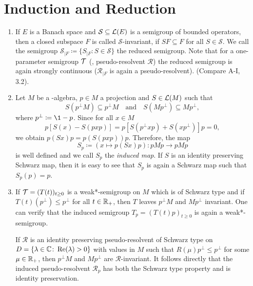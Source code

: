 \section{Induction and Reduction}
\begin{enumerate}[1., wide, labelsep=1em, itemindent=\parindent]
\item
If $ E $ is a Banach space and $ \mathcal{S} \subseteq \mathcal{L}(E) $ is a semigroup of bounded operators, then a closed subspace $ F $ is called $ \mathcal{S} $-invariant, if $ SF \subseteq F $ for all $ S \in \mathcal{S} $.
We call the semigroup $ \mathcal{S}_{\vert F} \coloneqq \{S_{\vert F} \colon S \in \mathcal{S} \} $ the reduced semigroup.
Note that for a one-parameter semigroup $ \mathcal{T} $ (\resp, pseudo-resolvent $ \mathcal{R} $) the reduced semigroup is again strongly continuous (\resp $ \mathcal{R}_{\vert F} $ is again a pseudo-resolvent). (Compare A-I, 3.2).

\item
Let $ M $ be a \WA-algebra, $ p \in M $ a projection and $ S \in \mathcal{L}(M) $ such that 
%
\[
	S( p^{\perp}M ) \subseteq p^{\perp}M 
	\quad \text{and} \quad 
	S( Mp^{\perp} ) \subseteq Mp^{\perp} ,  
\]
%
where $ p^{\perp} \coloneqq \1-p $.
Since for all $ x \in M $
\[
p[S(x) - S(pxp)] = p[S(p^{\perp}xp) + S(xp^{\perp})]p = 0,
\]
we obtain $ p(Sx)p = p(S(pxp))p $.
Therefore, the map
\[
S_{p} \coloneqq (x \mapsto p(Sx)p) \colon pMp \to pMp
\]
is well defined and we call $ S_{p} $ the \emph{induced map}.
If $ S $ is an identity preserving Schwarz map, then it is easy to see that $ S_{p} $ is again a Schwarz map such that $ S_{p}(p) = p $.

\item
If $ \mathcal{T} = (T(t))_{t\geq0} $ is a weak*-semigroup on $ M $ which is of Schwarz type and if $ T(t)(p^{\perp}) \leq p^{\perp} $ for all $ t \in \mathbb{R}_{+} $, then $ T $ leaves $ p^{\perp}M $ and $ Mp^{\perp} $ invariant.
One can verify that the induced semigroup $T_p = (T(t)p)_{t \geq 0}$ is again a weak*-semigroup.

If  $ \mathcal{R} $ is an identity preserving pseudo-resolvent of Schwarz type on $ D = \{\lambda \in \mathbb{C} \colon \mathop{}\!\mathrm{Re}(\lambda) > 0\} $ with values in $ M $ such that $ R(\mu)p^{\perp} \leq p^{\perp} $ for some $ \mu \in \mathbb{R}_{+} $, then $ p^{\perp}M $ and $ Mp^{\perp} $ are  $ \mathcal{R} $-invariant.
It follows directly that the induced pseudo-resolvent $ \mathcal{R}_p$ has both the Schwarz type property and is identity preservation.


\end{enumerate}
